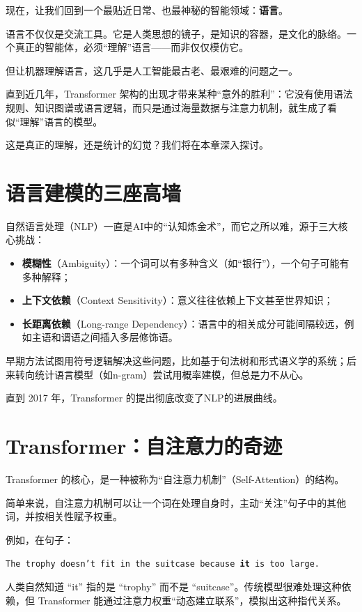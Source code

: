 现在，让我们回到一个最贴近日常、也最神秘的智能领域：\textbf{语言}。

语言不仅仅是交流工具。它是人类思想的镜子，是知识的容器，是文化的脉络。一个真正的智能体，必须“理解”语言——而非仅仅模仿它。

但让机器理解语言，这几乎是人工智能最古老、最艰难的问题之一。

直到近几年，Transformer 架构的出现才带来某种“意外的胜利”：它没有使用语法规则、知识图谱或语言逻辑，而只是通过海量数据与注意力机制，就生成了看似“理解”语言的模型。

这是真正的理解，还是统计的幻觉？我们将在本章深入探讨。

\section*{语言建模的三座高墙}

自然语言处理（NLP）一直是AI中的“认知炼金术”，而它之所以难，源于三大核心挑战：

\begin{itemize}
\item \textbf{模糊性}（Ambiguity）：一个词可以有多种含义（如“银行”），一个句子可能有多种解释；
\item \textbf{上下文依赖}（Context Sensitivity）：意义往往依赖上下文甚至世界知识；
\item \textbf{长距离依赖}（Long-range Dependency）：语言中的相关成分可能间隔较远，例如主语和谓语之间插入多层修饰语。
\end{itemize}

早期方法试图用符号逻辑解决这些问题，比如基于句法树和形式语义学的系统；后来转向统计语言模型（如n-gram）尝试用概率建模，但总是力不从心。

直到 2017 年，Transformer 的提出彻底改变了NLP的进展曲线。

\section*{Transformer：自注意力的奇迹}

Transformer 的核心，是一种被称为“自注意力机制”（Self-Attention）的结构。

简单来说，自注意力机制可以让一个词在处理自身时，主动“关注”句子中的其他词，并按相关性赋予权重。

例如，在句子：
\begin{center}
\texttt{The trophy doesn't fit in the suitcase because \textbf{it} is too large.}
\end{center}
人类自然知道 “it” 指的是 “trophy” 而不是 “suitcase”。传统模型很难处理这种依赖，但 Transformer 能通过注意力权重“动态建立联系”，模拟出这种指代关系。

